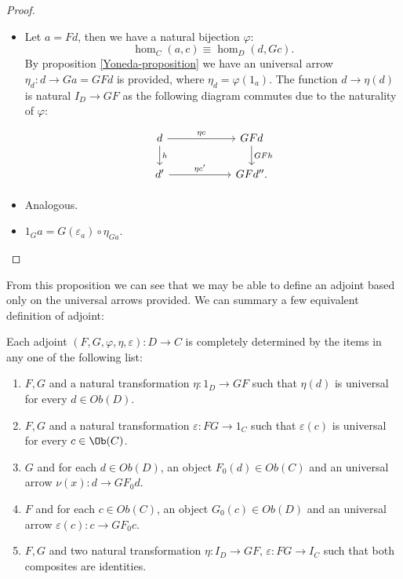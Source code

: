 \begin{proof}
  \begin{itemize}
  \item Let $a=Fd$, then we have a natural bijection $\varphi$:
    $$\hom_C(a, c)\equiv\hom_D(d, Gc).$$
By proposition \ref{Yoneda-proposition} we have an universal arrow $\eta_d:d\to Ga=GFd$ is provided, where $\eta_d = \varphi(1_a)$. The function $d\to \eta(d)$ is natural $I_D\to GF$ as the following diagram commutes due to the naturality of $\varphi$:
    \[
  \begin{tikzpicture}
  \node {\begin{tikzcd}[column sep=20mm]
      d\ar[r,"\eta c"]\ar[d,"h"] & GFd\ar[d,"GFh"]\\
      d'\ar[r,"\eta c'"] & GFd''.
  \end{tikzcd}};
\end{tikzpicture}
\]

\item Analogous.
\item $1_Ga = G(\varepsilon_a)\circ \eta_{Ga}$.
  \end{itemize} 
\end{proof}

From this proposition we can see that we may be able to define an adjoint based only on the universal arrows provided. We can summary a few equivalent definition of adjoint:
\begin{proposition}\label{prop:equivdefinition}
  Each adjoint $(F,G,\varphi,\eta,\varepsilon):D\to C$ is completely determined by the items in any one of the following list:
  \begin{enumerate}
  \item $F,G$ and a natural transformation $\eta:1_D\to GF$ such that $\eta(d)$ is universal for every $d\in Ob(D)$.
  \item $F,G$ and a natural transformation $\varepsilon:FG\to 1_C$ such that $\varepsilon(c)$ is universal for every $c\in \Ob(C)$.
  \item $G$ and for each $d\in Ob(D)$, an object $F_0(d)\in Ob(C)$ and an universal arrow $\nu(x):d \to GF_0 d$.
  \item $F$ and for each $c\in Ob(C)$, an object $G_0(c)\in Ob(D)$ and an universal arrow $\varepsilon(c):c \to GF_0 c$.
  \item  $F,G$ and two natural transformation $\eta: I_D\to GF$, $\varepsilon: FG\to I_C$ such that both composites are identities.
  \end{enumerate}
\end{proposition}

